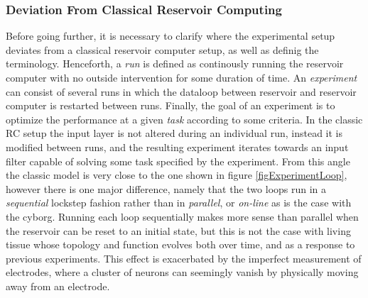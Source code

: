 \subsubsection{Deviation From Classical Reservoir Computing}
Before going further, it is necessary to clarify where the experimental setup
deviates from a classical reservoir computer setup, as well as definig the
terminology.
Henceforth, a \emph{run} is defined as continously running the reservoir
computer with no outside intervention for some duration of time.
An \emph{experiment} can consist of several runs in which the dataloop between
reservoir and reservoir computer is restarted between runs. 
Finally, the goal of an experiment is to optimize the performance at a given
\emph{task} according to some criteria.
In the classic RC setup the input layer is not altered during an individual run,
instead it is modified between runs, and the resulting experiment iterates
towards an input filter capable of solving some task specified by the
experiment.
From this angle the classic model is very close to the one shown in figure
\ref{figExperimentLoop}, however there is one major difference, namely that the two
loops run in a \emph{sequential} lockstep fashion 
rather than in \emph{parallel}, or \emph{on-line} as is the case with the cyborg.
Running each loop sequentially makes more sense than parallel when the reservoir
can be reset to an initial state, but this is not 
the case with living tissue whose topology and function evolves both over time,
and as a response to previous experiments. This effect is exacerbated by the
imperfect measurement of electrodes, where a cluster of neurons can seemingly
vanish by physically moving away from an electrode.
